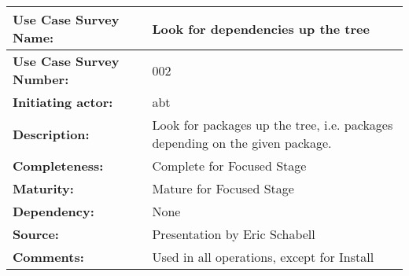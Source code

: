 \begin{tabularx}{\linewidth}{|l|X|}
\hline
\textbf{Use Case Survey Name:} & \textbf{Look for dependencies up the tree} \\
\hline
\textbf{Use Case Survey Number:} & 002 \\
\hline
\textbf{Initiating actor:} & abt \\
\hline
\textbf{Description:} & Look for packages up the tree, i.e. packages depending on the given package.\\
\hline
\textbf{Completeness:} & Complete for Focused Stage \\
\hline
\textbf{Maturity:} & Mature for Focused Stage \\
\hline
\textbf{Dependency:} & None \\
\hline
\textbf{Source:} & Presentation by Eric Schabell \\
\hline
\textbf{Comments:} & Used in all operations, except for Install \\
\hline
\end{tabularx}
	
